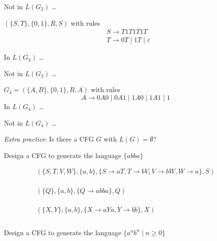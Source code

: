 \documentclass[12pt, oneside]{article}
\begin{document}
  \vspace{110pt}
  
  Not in $L(G_2)$ \ldots 

  \vspace{110pt}

  $(\{S, T\}, \{0, 1\}, R, S)$ with  rules
  \begin{align*}
  &S \to T1T1T1T \\
  &T \to  0T \mid 1T \mid \varepsilon
  \end{align*}

  In  $L(G_3)$ \ldots 
  
  \vspace{110pt}
  
  Not in $L(G_3)$ \ldots 

  \vspace{110pt}


  $G_4 =  (\{A, B\}, \{0, 1\}, R, A)$ with rules
  \[
    A \to 0A0 \mid  0A1 \mid 1A0  \mid 1A1 \mid  1
  \]
  In  $L(G_4)$ \ldots 
  
  \vspace{110pt}
  
  Not in $L(G_4)$ \ldots 

  \vspace{110pt}

  
{\it Extra practice}: Is there a CFG $G$ with $L(G) = \emptyset$?

  \newpage
  
  Design a CFG to generate the  language $\{abba\}$
  
  \begin{align*}
  & ( \{ S, T, V, W\}, \{a,b\}, \{ S \to aT, T \to bV, V \to bW, W \to a\}, S)\\
  & \\ 
  & \\ 
  & \\ 
  & ( \{ Q \}, \{a,b\}, \{Q \to abba\}, Q) \\
  & \\ 
  & \\ 
  & \\
  & ( \{ X,Y \}, \{a,b\}, \{X \to aYa, Y \to bb\}, X) 
  & \\ 
  & \\ 
  \end{align*} 


  Design a CFG to generate the  language $\{a^n b^n \mid  n  \geq  0\}$
  
  \vspace{150pt}
  
\end{document}
